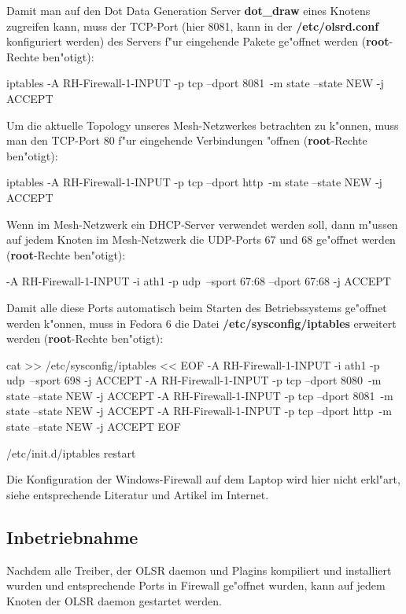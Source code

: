 Damit man auf den Dot Data Generation Server \textbf{dot\_draw}
eines Knotens zugreifen kann, muss der TCP-Port
(hier 8081, kann in der \textbf{/etc/olsrd.conf} konfiguriert werden)
des Servers f"ur eingehende Pakete ge"offnet werden
(\textbf{root}-Rechte ben"otigt):
\begin{shelllst}
iptables -A RH-Firewall-1-INPUT -p tcp --dport 8081\
	-m state --state NEW -j ACCEPT
\end{shelllst}

Um die aktuelle Topology unseres Mesh-Netzwerkes betrachten zu k"onnen,
muss man den TCP-Port 80 f"ur eingehende Verbindungen "offnen
(\textbf{root}-Rechte ben"otigt):
\begin{shelllst}
iptables -A RH-Firewall-1-INPUT -p tcp --dport http\
	-m state --state NEW -j ACCEPT
\end{shelllst}

Wenn im Mesh-Netzwerk ein DHCP-Server verwendet werden soll, dann
m"ussen auf jedem Knoten im Mesh-Netzwerk die UDP-Ports 67 und 68
ge"offnet werden (\textbf{root}-Rechte ben"otigt):
\begin{shelllst}
-A RH-Firewall-1-INPUT -i ath1 -p udp\
	--sport 67:68 --dport 67:68 -j ACCEPT
\end{shelllst}

Damit alle diese Ports automatisch beim Starten des Betriebssystems
ge"offnet werden k"onnen, muss in Fedora 6
die Datei \textbf{/etc/sysconfig/iptables} erweitert werden
(\textbf{root}-Rechte ben"otigt):
\begin{shelllst}
cat >> /etc/sysconfig/iptables << EOF
-A RH-Firewall-1-INPUT -i ath1 -p udp\
	--sport 698 -j ACCEPT
-A RH-Firewall-1-INPUT -p tcp --dport 8080\
	-m state --state NEW -j ACCEPT
-A RH-Firewall-1-INPUT -p tcp --dport 8081\
	-m state --state NEW -j ACCEPT
-A RH-Firewall-1-INPUT -p tcp --dport http\
	-m state --state NEW -j ACCEPT
EOF

/etc/init.d/iptables restart
\end{shelllst}

Die Konfiguration der Windows-Firewall auf dem Laptop wird hier nicht erkl"art,
siehe entsprechende Literatur und Artikel im Internet.

\subsection{Inbetriebnahme}

Nachdem alle Treiber, der OLSR daemon und Plagins kompiliert und installiert
wurden und entsprechende Ports in Firewall ge"offnet wurden,
kann auf jedem Knoten der OLSR daemon gestartet werden.

